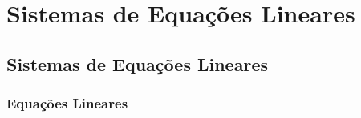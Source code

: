 
\chapter{Sistemas de Equações Lineares}
\section{Sistemas de Equações Lineares}

\subsection{Equações Lineares}

